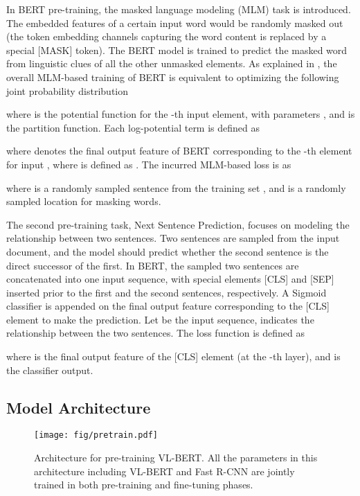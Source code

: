 \documentclass{article} \usepackage{iclr2020_conference,times}
\begin{document}
In BERT pre-training, the masked language modeling (MLM) task is introduced. The embedded features of a certain input word would be randomly masked out (the token embedding channels capturing the word content is replaced by a special [MASK] token). The BERT model is trained to predict the masked word from linguistic clues of all the other unmasked elements. As explained in \cite{wang2019bertmrf}, the overall MLM-based training of BERT is equivalent to optimizing the following joint probability distribution

where  is the potential function for the -th input element, with parameters , and  is the partition function. Each log-potential term  is defined as

where  denotes the final output feature of BERT corresponding to the -th element for input , where  is defined as . The incurred MLM-based loss is as

where  is a randomly sampled sentence from the training set , and  is a randomly sampled location for masking words. 


The second pre-training task, Next Sentence Prediction, focuses on modeling the relationship between two sentences. Two sentences are sampled from the input document, and the model should predict whether the second sentence is the direct successor of the first. In BERT, the sampled two sentences are concatenated into one input sequence, with special elements [CLS] and [SEP] inserted prior to the first and the second sentences, respectively. 
A Sigmoid classifier is appended on the final output feature corresponding to the [CLS] element to make the prediction. Let  be the input sequence,  indicates the relationship between the two sentences. The loss function is defined as

where  is the final output feature of the [CLS] element (at the -th layer), and  is the classifier output. 


\subsection{Model Architecture}

\begin{figure*}
\begin{center}
        \texttt{[image: fig/pretrain.pdf]}
\end{center}
\vspace{-0.5em}
\caption{Architecture for pre-training VL-BERT. All the parameters in this architecture including VL-BERT and Fast R-CNN are jointly trained in both pre-training and fine-tuning phases.}
\vspace{-0.5em}
\label{fig.pretrain_arch}
\end{figure*}
\end{document}
